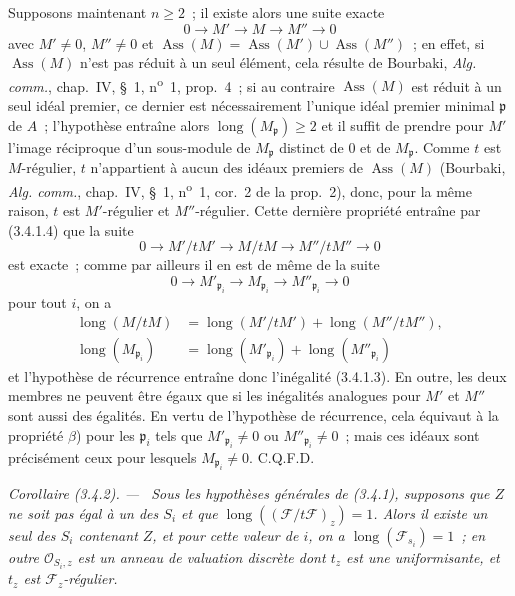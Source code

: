 \documentclass[10pt,oneside]{book}
\newcommand{\oldpage}[2][]{%
  \setcounter{footnote}{0}%
  \marginpar{\scriptsize\textbf{#1}~|~#2}\ignorespaces}
\newenvironment{corollary}[1][]{%
  \par\medskip\noindent\itshape Corollaire (#1). ---\ }{\par}
\begin{document}
Supposons maintenant $n\geqslant2$~; il existe alors une suite exacte
\[
0\longrightarrow M'\longrightarrow M\longrightarrow M''\longrightarrow0
\]
avec $M'\neq0$, $M''\neq0$ et
$\operatorname{Ass}(M)=\operatorname{Ass}(M')\cup\operatorname{Ass}(M'')$~;
en effet, si $\operatorname{Ass}(M)$ n'est pas réduit à un seul élément, cela
résulte de Bourbaki, \emph{Alg. comm.}, chap.~IV, \S~1,
n\textsuperscript{o}~1, prop.~4~; si au contraire $\operatorname{Ass}(M)$ est
réduit à un seul idéal premier, ce dernier est nécessairement l'unique idéal
premier minimal $\mathfrak p$ de $A$~; l'hypothèse entraîne alors
$\operatorname{long}(M_{\mathfrak p})\geqslant2$ et il suffit de prendre pour
$M'$ l'image réciproque d'un sous-module de $M_{\mathfrak p}$ distinct de $0$
et de $M_{\mathfrak p}$. Comme $t$ est $M$-régulier, $t$ n'appartient à aucun
des idéaux premiers de $\operatorname{Ass}(M)$ (Bourbaki,
\emph{Alg. comm.}, chap.~IV, \S~1, n\textsuperscript{o}~1, cor.~2 de la
prop.~2), donc, pour la même raison, $t$ est $M'$-régulier et
$M''$-régulier. Cette dernière propriété entraîne par (3.4.1.4) que la suite
\[
0\longrightarrow M'/tM'\longrightarrow M/tM
\longrightarrow M''/tM''\longrightarrow0
\]
est exacte~; comme par ailleurs il en est de même de la suite
\[
0\longrightarrow M'_{\mathfrak p_i}\longrightarrow M_{\mathfrak p_i}
\longrightarrow M''_{\mathfrak p_i}\longrightarrow0
\]
pour tout $i$, on a
\[
\begin{aligned}
\operatorname{long}(M/tM)
&=\operatorname{long}(M'/tM')+\operatorname{long}(M''/tM''),\\
\operatorname{long}(M_{\mathfrak p_i})
&=\operatorname{long}(M'_{\mathfrak p_i})
 +\operatorname{long}(M''_{\mathfrak p_i})
\end{aligned}
\]
et l'hypothèse de récurrence entraîne donc l'inégalité (3.4.1.3). En outre,
les deux membres ne peuvent être égaux que si les inégalités analogues pour
$M'$ et $M''$ sont aussi des égalités. En vertu de l'hypothèse de récurrence,
cela équivaut à la propriété $\beta$) pour les $\mathfrak p_i$ tels que
$M'_{\mathfrak p_i}\neq0$ ou $M''_{\mathfrak p_i}\neq0$~; mais ces idéaux sont
précisément ceux pour lesquels $M_{\mathfrak p_i}\neq0$. C.Q.F.D.

\oldpage[IV-2]{49}

\begin{corollary}[3.4.2]
\label{IV.2.3.4.2-fr}
Sous les hypothèses générales de (3.4.1), supposons que $Z$ ne soit pas égal
à un des $S_i$ et que
$\operatorname{long}((\mathcal F/t\mathcal F)_z)=1$. Alors il existe un seul
des $S_i$ contenant $Z$, et pour cette valeur de $i$, on a
$\operatorname{long}(\mathcal F_{s_i})=1$~; en outre
$\mathcal O_{S_i,z}$ est un anneau de valuation discrète dont $t_z$ est une
uniformisante, et $t_z$ est $\mathcal F_z$-régulier.
\end{corollary}
\end{document}
